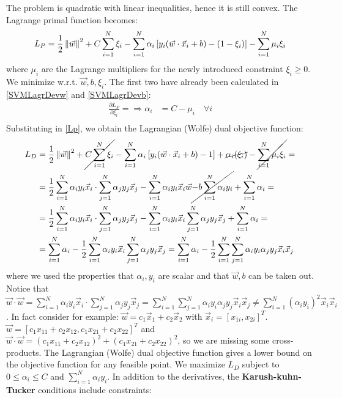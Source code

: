\documentclass[12pt, letterpaper]{article}
\theoremstyle{definition}
\DeclarePairedDelimiter\autobracket{(}{)}
\newcommand{\br}[1]{\autobracket*{#1}}
\newcommand\norm[1]{\left\lVert#1\right\rVert}
\begin{document}
The problem is quadratic with linear inequalities, hence it is still convex. The Lagrange primal function becomes:
\begin{equation}
L_P = \frac{1}{2}\norm{ \vec{w}}^2 + C \sum_{i=1}^N \xi_i - \sum_{i=1}^N \alpha_i \left[y_i\br{
\vec{w} \cdot \vec{x}_i+b}-\br{1-\xi_i}\right] - \sum_{i=1}^N \mu_i \xi_i 
\label{Lp}
\end{equation}
where $\mu_i$ are the Lagrange multipliers for the newly introduced constraint $\xi_i\ge 0$.
We minimize w.r.t. $\vec{w}, b, \xi_i$. The first two have already been calculated in \autoref{SVMLagrDevw} and \autoref{SVMLagrDevb}:
\begin{equation}
\begin{aligned}
\frac{\partial L_P}{\partial \xi_i} = \Rightarrow \alpha_i &= C - \mu_i \quad \forall i\\
\end{aligned}
\end{equation}
Substituting in \autoref{Lp}, we obtain the Lagrangian (Wolfe) dual objective function:
\begin{equation}
\begin{aligned}
L_D &=  \frac{1}{2}\norm{ \vec{w}}^2 + \cancel{C \sum_{i=1}^N \xi_i} - \sum_{i=1}^N \alpha_i \left[y_i\br{
\vec{w} \cdot \vec{x}_i+b} -1\right]+\cancel{\alpha_i\br{\xi_i}} - \cancel{\sum_{i=1}^N \mu_i \xi_i} = \\
&=\frac{1}{2}\sum_{i=1}^N  \alpha_i y_i \vec{x}_i \cdot \sum_{j=1}^N  \alpha_j y_j \vec{x}_j- \sum_{i=1}^N \alpha_i y_i \vec{x}_i\vec{w} \cancel{- b\sum_{i=1}^N \alpha_i y_i}+ \sum_{i=1}^N \alpha_i =\\
&=\frac{1}{2}\sum_{i=1}^N  \alpha_i y_i \vec{x}_i \cdot \sum_{j=1}^N  \alpha_j y_j \vec{x}_j- \sum_{i=1}^N \alpha_i y_i \vec{x}_i\sum_{j=1}^N \alpha_j y_j \vec{x}_j+ \sum_{i=1}^N \alpha_i =\\
&= \sum_{i=1}^N \alpha_i - \frac{1}{2}\sum_{i=1}^N \alpha_i y_i \vec{x}_i\sum_{j=1}^N \alpha_j y_j \vec{x}_j = \sum_{i=1}^N \alpha_i - \frac{1}{2}\sum_{i=1}^N\sum_{j=1}^N \alpha_i y_i \alpha_j y_j\vec{x}_i  \vec{x}_j
\end{aligned}
\label{LagrangeDueal}
\end{equation}
where we used the properties that $\alpha_i, y_i$ are scalar and that $\vec{w}, b$ can be taken out. Notice that $\vec{w}\cdot \vec{w}  = \sum_{i=1}^N \alpha_i y_i \vec{x}_i\cdot\sum_{j=1}^N\alpha_j y_j \vec{x}_j =\sum_{i=1}^N \sum_{j=1}^N \alpha_i y_i \alpha_j y_j  \vec{x}_i\vec{x}_j \ne \sum_{i=1}^N  (\alpha_i y_i)^2 \vec{x}_i\vec{x}_i$. In fact consider for example: $\vec{w} = c_1\vec{x}_1 + c_2\vec{x}_2$ with $\vec{x}_i = \left[x_{1i}, x_{2i}\right]^T$. $\vec{w} = \left[ c_1x_{11}+c_2x_{12}, c_1x_{21}+c_2x_{22} \right]^T$ and $\vec{w}\cdot \vec{w} = (c_1x_{11}+c_2x_{12})^2+(c_1x_{21}+c_2x_{22})^2$, so we are missing some cross-products. The Lagrangian (Wolfe) dual objective function gives a lower bound on the objective function for any feasible point. We maximize $L_D$ subject to $0\le \alpha_i\le C$ and $\sum_{i=1}^N\alpha_iy_i$. In addition to the derivatives, the \textbf{Karush-kuhn-Tucker} conditions include constraints:
\end{document}
